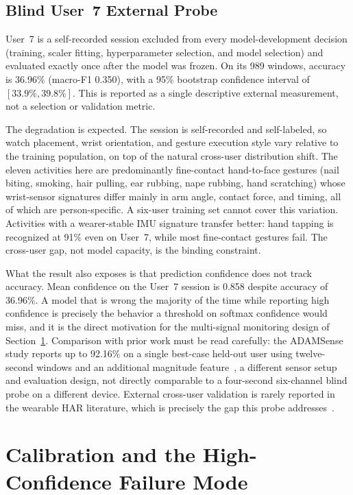 \subsection{Blind User~7 External Probe}
\label{sec:ch7_user7}

User~7 is a self-recorded session excluded from every model-development decision (training, scaler fitting, hyperparameter selection, and model selection) and evaluated exactly once after the model was frozen. On its 989 windows, accuracy is 36.96\% (macro-F1 0.350), with a 95\% bootstrap confidence interval of \([33.9\%, 39.8\%]\). This is reported as a single descriptive external measurement, not a selection or validation metric.

The degradation is expected. The session is self-recorded and self-labeled, so watch placement, wrist orientation, and gesture execution style vary relative to the training population, on top of the natural cross-user distribution shift. The eleven activities here are predominantly fine-contact hand-to-face gestures (nail biting, smoking, hair pulling, ear rubbing, nape rubbing, hand scratching) whose wrist-sensor signatures differ mainly in arm angle, contact force, and timing, all of which are person-specific. A six-user training set cannot cover this variation. Activities with a wearer-stable IMU signature transfer better: hand tapping is recognized at 91\% even on User~7, while most fine-contact gestures fail. The cross-user gap, not model capacity, is the binding constraint.

What the result also exposes is that prediction confidence does not track accuracy. Mean confidence on the User~7 session is 0.858 despite accuracy of 36.96\%. A model that is wrong the majority of the time while reporting high confidence is precisely the behavior a threshold on softmax confidence would miss, and it is the direct motivation for the multi-signal monitoring design of Section~\ref{sec:ch7_calibration}. Comparison with prior work must be read carefully: the ADAMSense study reports up to 92.16\% on a single best-case held-out user using twelve-second windows and an additional magnitude feature~\cite{khan2021adamsense}, a different sensor setup and evaluation design, not directly comparable to a four-second six-channel blind probe on a different device. External cross-user validation is rarely reported in the wearable HAR literature, which is precisely the gap this probe addresses~\cite{shen2025passivesensing}.

\section{Calibration and the High-Confidence Failure Mode}
\label{sec:ch7_calibration}

